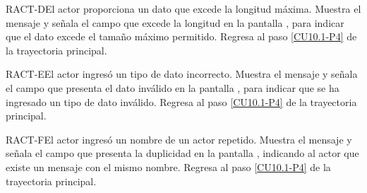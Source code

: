 	\begin{UCtrayectoriaA}{RACT-D}{El actor proporciona un dato que excede la longitud máxima.}
		\UCpaso[\UCsist] Muestra el mensaje  y señala el campo que excede la longitud en la pantalla , para indicar que el dato excede el tamaño máximo permitido.
		\UCpaso Regresa al paso \ref{CU10.1-P4} de la trayectoria principal.
	\end{UCtrayectoriaA}

	\begin{UCtrayectoriaA}{RACT-E}{El actor ingresó un tipo de dato incorrecto.}
		\UCpaso[\UCsist] Muestra el mensaje  y señala el campo que presenta el dato inválido en la pantalla , para indicar que se ha ingresado un tipo de dato inválido.
		\UCpaso Regresa al paso \ref{CU10.1-P4} de la trayectoria principal.
	\end{UCtrayectoriaA}
	
	\begin{UCtrayectoriaA}{RACT-F}{El actor ingresó un nombre de un actor repetido.}
		\UCpaso[\UCsist] Muestra el mensaje  y señala el campo que presenta la duplicidad en la pantalla , indicando al actor que existe un mensaje con el mismo nombre.
		\UCpaso Regresa al paso \ref{CU10.1-P4} de la trayectoria principal.
	\end{UCtrayectoriaA}

